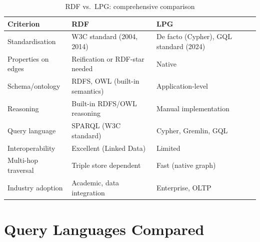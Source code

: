\documentclass[11pt,a4paper,oneside,openany]{book}
\theoremstyle{definition}
\theoremstyle{plain}
\theoremstyle{remark}
\begin{document}
\begin{table}[h]
	\centering
	\caption{RDF vs.\ LPG: comprehensive comparison}
	\label{tab:rdf-vs-lpg}
	\begin{tabular}{lp{5.5cm}p{5.5cm}}
		\toprule
		Criterion           & RDF                            & LPG                                    \\
		\midrule
		Standardisation     & W3C standard (2004, 2014)      & De facto (Cypher), GQL standard (2024) \\
		Properties on edges & Reification or RDF-star needed & Native                                 \\
		Schema/ontology     & RDFS, OWL (built-in semantics) & Application-level                      \\
		Reasoning           & Built-in RDFS/OWL reasoning    & Manual implementation                  \\
		Query language      & SPARQL (W3C standard)          & Cypher, Gremlin, GQL                   \\
		Interoperability    & Excellent (Linked Data)        & Limited                                \\
		Multi-hop traversal & Triple store dependent         & Fast (native graph)                    \\
		Industry adoption   & Academic, data integration     & Enterprise, OLTP                       \\
		\bottomrule
	\end{tabular}
\end{table}

\section{Query Languages Compared}\label{sec:query-compare}
\end{document}
